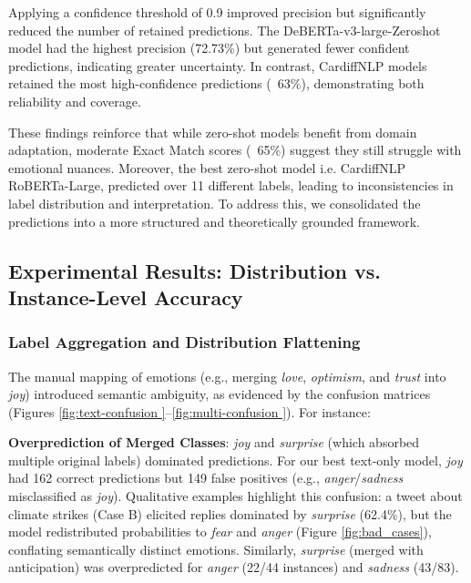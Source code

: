 Applying a confidence threshold of 0.9 improved precision but significantly reduced the number of retained predictions. The DeBERTa-v3-large-Zeroshot model had the highest precision (72.73\%) but generated fewer confident predictions, indicating greater uncertainty. In contrast, CardiffNLP models retained the most high-confidence predictions (~63\%), demonstrating both reliability and coverage.
\newline

These findings reinforce that while zero-shot models benefit from domain adaptation, moderate Exact Match scores (~65\%) suggest they still struggle with emotional nuances. Moreover, the best zero-shot model i.e. CardiffNLP RoBERTa-Large, predicted over 11 different labels, leading to inconsistencies in label distribution and interpretation. To address this, we consolidated the predictions into a more structured and theoretically grounded framework.


\subsection{Experimental Results: Distribution vs. Instance-Level Accuracy}

\subsubsection*{Label Aggregation and Distribution Flattening}
The manual mapping of emotions (e.g., merging \textit{love}, \textit{optimism}, and \textit{trust} into \emph{joy}) introduced semantic ambiguity, as evidenced by the confusion matrices (Figures \ref{fig:text-confusion }--\ref{fig:multi-confusion }). For instance:
\newline

\textbf{Overprediction of Merged Classes}: \emph{joy} and \emph{surprise} (which absorbed multiple original labels) dominated predictions. For our best text-only model, \emph{joy} had 162 correct predictions but 149 false positives (e.g., \emph{anger}/\emph{sadness} misclassified as \emph{joy}). Qualitative examples highlight this confusion: a tweet about climate strikes (Case B) elicited replies dominated by \emph{surprise} (62.4\%), but the model redistributed probabilities to \emph{fear} and \emph{anger} (Figure \ref{fig:bad_cases}), conflating semantically distinct emotions. Similarly, \emph{surprise} (merged with anticipation) was overpredicted for \emph{anger} (22/44 instances) and \emph{sadness} (43/83).
\newline

